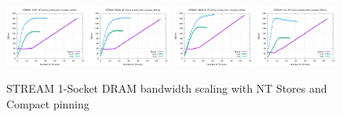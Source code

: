 \documentclass{article}
\begin{document}
\begin{figure}[!ht]
    \centering
    \includegraphics[width=0.24\textwidth]{../data/rome-clx-icx/mem_bw_scale/mb_scale_compact_Copy_nt}
    \includegraphics[width=0.24\textwidth]{../data/rome-clx-icx/mem_bw_scale/mb_scale_compact_Triad_nt}
    \includegraphics[width=0.24\textwidth]{../data/rome-clx-icx/mem_bw_scale/mb_scale_compact_Reduce_nt}
    \includegraphics[width=0.24\textwidth]{../data/rome-clx-icx/mem_bw_scale/mb_scale_compact_Fill_nt}
    \caption{STREAM 1-Socket DRAM bandwidth scaling with NT Stores and Compact pinning}
    \label{figure:mem_bw_scale_compact_nt}
\end{figure}
\end{document}
